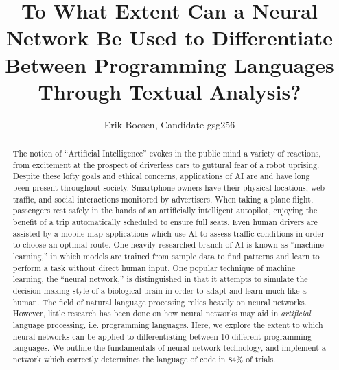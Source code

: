 \documentclass{article}
\begin{document}
\title{To What Extent Can a Neural Network Be Used to Differentiate Between Programming Languages Through Textual Analysis?}
\author{Erik Boesen, Candidate gsg256}

\maketitle

\begin{abstract}
The notion of ``Artificial Intelligence'' evokes in the public mind a variety of reactions, from excitement at the prospect of driverless cars to guttural fear of a robot uprising. Despite these lofty goals and ethical concerns, applications of AI are and have long been present throughout society. Smartphone owners have their physical locations, web traffic, and social interactions monitored by advertisers. When taking a plane flight, passengers rest safely in the hands of an artificially intelligent autopilot, enjoying the benefit of a trip automatically scheduled to ensure full seats. Even human drivers are assisted by a mobile map applications which use AI to assess traffic conditions in order to choose an optimal route. One heavily researched branch of AI is known as ``machine learning,'' in which models are trained from sample data to find patterns and learn to perform a task without direct human input. One popular technique of machine learning, the ``neural network,'' is distinguished in that it attempts to simulate the decision-making style of a biological brain in order to adapt and learn much like a human. The field of natural language processing relies heavily on neural networks. However, little research has been done on how neural networks may aid in \textit{artificial} language processing, i.e. programming languages. Here, we explore the extent to which neural networks can be applied to differentiating between 10 different programming languages. We outline the fundamentals of neural network technology, and implement a network which correctly determines the language of code in 84\% of trials.
\end{abstract}

\tableofcontents
\pagebreak
\end{document}
